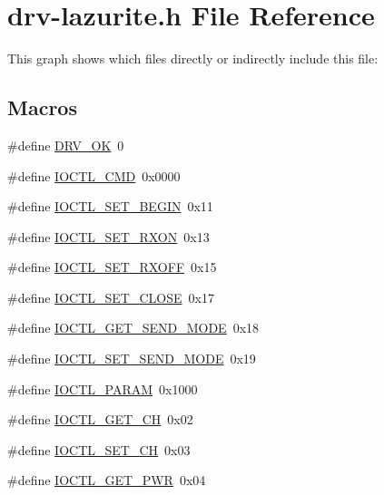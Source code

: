 \hypertarget{drv-lazurite_8h}{\section{drv-\/lazurite.h File Reference}
\label{drv-lazurite_8h}
}
This graph shows which files directly or indirectly include this file\+:
\subsection*{Macros}
\begin{DoxyCompactItemize}
\item 
\#define \hyperlink{drv-lazurite_8h_a60093c02ec178d674322a77a3727ac29}{D\+R\+V\+\_\+\+O\+K}~0
\item 
\#define \hyperlink{drv-lazurite_8h_af6dd506f10481cb1ffa32bb8ecdcedfa}{I\+O\+C\+T\+L\+\_\+\+C\+M\+D}~0x0000
\item 
\#define \hyperlink{drv-lazurite_8h_a96ccf615f95e6db7d124292586c0872b}{I\+O\+C\+T\+L\+\_\+\+S\+E\+T\+\_\+\+B\+E\+G\+I\+N}~0x11
\item 
\#define \hyperlink{drv-lazurite_8h_aa96ab95f436ac162bb64e4a7b4a4741b}{I\+O\+C\+T\+L\+\_\+\+S\+E\+T\+\_\+\+R\+X\+O\+N}~0x13
\item 
\#define \hyperlink{drv-lazurite_8h_a02db6a5c5566d3dd20373655dee1abc1}{I\+O\+C\+T\+L\+\_\+\+S\+E\+T\+\_\+\+R\+X\+O\+F\+F}~0x15
\item 
\#define \hyperlink{drv-lazurite_8h_a0724180b95bc004347034b6cf31506d2}{I\+O\+C\+T\+L\+\_\+\+S\+E\+T\+\_\+\+C\+L\+O\+S\+E}~0x17
\item 
\#define \hyperlink{drv-lazurite_8h_ab71145a8dcf0f953b13e086c62770409}{I\+O\+C\+T\+L\+\_\+\+G\+E\+T\+\_\+\+S\+E\+N\+D\+\_\+\+M\+O\+D\+E}~0x18
\item 
\#define \hyperlink{drv-lazurite_8h_a8fe7229bdd344d76770655852e459ce2}{I\+O\+C\+T\+L\+\_\+\+S\+E\+T\+\_\+\+S\+E\+N\+D\+\_\+\+M\+O\+D\+E}~0x19
\item 
\#define \hyperlink{drv-lazurite_8h_ab9e5305683819be9f2cfc8d327a171ae}{I\+O\+C\+T\+L\+\_\+\+P\+A\+R\+A\+M}~0x1000
\item 
\#define \hyperlink{drv-lazurite_8h_a4aebc1538172293f715a7acecc1be279}{I\+O\+C\+T\+L\+\_\+\+G\+E\+T\+\_\+\+C\+H}~0x02
\item 
\#define \hyperlink{drv-lazurite_8h_a8b2ea7ef9bf76ed1061c6e4caffed71c}{I\+O\+C\+T\+L\+\_\+\+S\+E\+T\+\_\+\+C\+H}~0x03
\item 
\#define \hyperlink{drv-lazurite_8h_a0f473f6967ba70243f5d127d67763afa}{I\+O\+C\+T\+L\+\_\+\+G\+E\+T\+\_\+\+P\+W\+R}~0x04

\end{DoxyCompactItemize}
